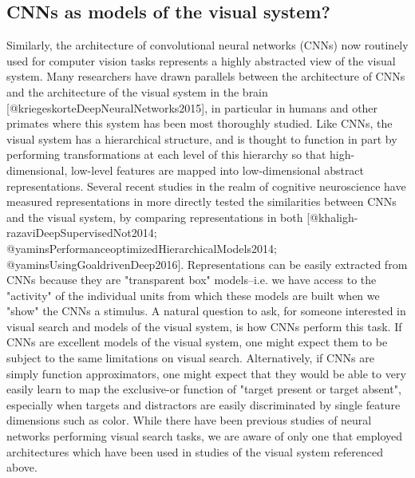 \documentclass[10pt,letterpaper]{article}
\begin{document}
\subsection{CNNs as models of the visual system?}
Similarly, the architecture of convolutional neural networks (CNNs) now routinely used for
computer vision tasks represents a highly abstracted view of the visual system.
Many researchers have drawn parallels between the architecture of CNNs and the 
architecture of the visual system in the brain [@kriegeskorteDeepNeuralNetworks2015], 
in particular in humans and other primates where this system has been most thoroughly 
studied. Like CNNs, the visual system has a hierarchical structure, and is thought to 
function in part by performing transformations at each level of this hierarchy so that 
high-dimensional, low-level features are mapped into low-dimensional abstract 
representations. Several recent studies in the realm of cognitive neuroscience 
have measured representations in more directly tested the similarities between CNNs and 
the visual system, by comparing representations in both [@khaligh-razaviDeepSupervisedNot2014; @yaminsPerformanceoptimizedHierarchicalModels2014; @yaminsUsingGoaldrivenDeep2016]. Representations 
can be easily extracted from CNNs because they are "transparent box" models--i.e. we have 
access to the "activity" of the individual units from which these models are built when 
we "show" the CNNs a stimulus.
A natural question to ask, for someone interested in visual search and models of the visual 
system, is how CNNs perform this task. If CNNs are excellent models of the visual system, 
one might expect them to be subject to the same limitations on visual search. Alternatively, 
if CNNs are simply function approximators, one might expect that they would be able to 
very easily learn to map the exclusive-or function of "target present or target absent", 
especially when targets and distractors are easily discriminated by single feature 
dimensions such as color. While there have been previous studies of neural networks 
performing visual search tasks, we are aware of only one that employed architectures 
which have been used in studies of the visual system referenced above.
\end{document}
